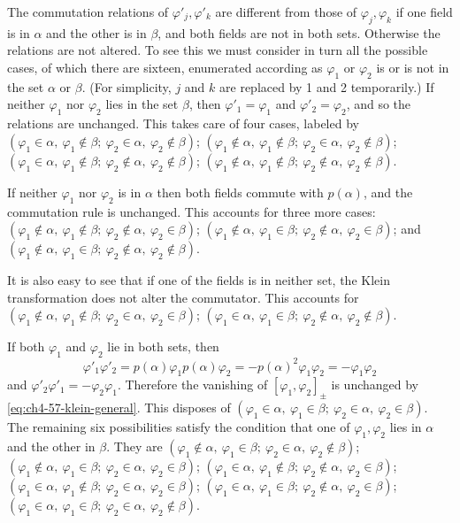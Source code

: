 The commutation relations of $\varphi'_j,\varphi'_k$ are different from those
of $\varphi_j,\varphi_k$ if one field is in $\alpha$ and the other is in
$\beta$, and both fields are not in both sets.  Otherwise the relations are
not altered.  To see this we must consider in turn all the possible cases, of
which there are sixteen, enumerated according as $\varphi_1$ or $\varphi_2$
is or is not in the set $\alpha$ or $\beta$.  (For simplicity, $j$ and $k$
are replaced by 1 and 2 temporarily.)  If neither $\varphi_1$ nor
$\varphi_2$ lies in the set $\beta$, then $\varphi'_1=\varphi_1$ and
$\varphi'_2=\varphi_2$, and so the relations are unchanged.  This takes care
of four cases, labeled by
$(\varphi_1\in\alpha,\ \varphi_1\notin\beta;\ \varphi_2\in\alpha,\ \varphi_2\notin\beta)$;
$(\varphi_1\notin\alpha,\ \varphi_1\notin\beta;\ \varphi_2\in\alpha,\ \varphi_2\notin\beta)$;
$(\varphi_1\in\alpha,\ \varphi_1\notin\beta;\ \varphi_2\notin\alpha,\ \varphi_2\notin\beta)$;
$(\varphi_1\notin\alpha,\ \varphi_1\notin\beta;\ \varphi_2\notin\alpha,\ \varphi_2\notin\beta)$.

If neither $\varphi_1$ nor $\varphi_2$ is in $\alpha$ then both fields commute
with $p(\alpha)$, and the commutation rule is unchanged.  This accounts for
three more cases:
$(\varphi_1\notin\alpha,\ \varphi_1\notin\beta;\ \varphi_2\notin\alpha,\ \varphi_2\in\beta)$;
$(\varphi_1\notin\alpha,\ \varphi_1\in\beta;\ \varphi_2\notin\alpha,\ \varphi_2\in\beta)$;
and $(\varphi_1\notin\alpha,\ \varphi_1\in\beta;\ \varphi_2\notin\alpha,\ \varphi_2\notin\beta)$.

It is also easy to see that if one of the fields is in neither set, the Klein
transformation does not alter the commutator.  This accounts for
$(\varphi_1\notin\alpha,\ \varphi_1\notin\beta;\ \varphi_2\in\alpha,\ \varphi_2\in\beta)$;
$(\varphi_1\in\alpha,\ \varphi_1\in\beta;\ \varphi_2\notin\alpha,\ \varphi_2\notin\beta)$.

If both $\varphi_1$ and $\varphi_2$ lie in both sets, then
\[
  \varphi'_1\varphi'_2=p(\alpha)\varphi_1p(\alpha)\varphi_2
  =-p(\alpha)^2\varphi_1\varphi_2=-\varphi_1\varphi_2
\]
and $\varphi'_2\varphi'_1=-\varphi_2\varphi_1$.  Therefore the vanishing of
$[\varphi_1,\varphi_2]_\pm$ is unchanged by \eqref{eq:ch4-57-klein-general}.  This disposes of
$(\varphi_1\in\alpha,\ \varphi_1\in\beta;\ \varphi_2\in\alpha,\ \varphi_2\in\beta)$.
The remaining six possibilities satisfy the condition that one of
$\varphi_1,\varphi_2$ lies in $\alpha$ and the other in $\beta$.  They are
$(\varphi_1\notin\alpha,\ \varphi_1\in\beta;\ \varphi_2\in\alpha,\ \varphi_2\notin\beta)$;
$(\varphi_1\notin\alpha,\ \varphi_1\in\beta;\ \varphi_2\in\alpha,\ \varphi_2\in\beta)$;
$(\varphi_1\in\alpha,\ \varphi_1\notin\beta;\ \varphi_2\notin\alpha,\ \varphi_2\in\beta)$;
$(\varphi_1\in\alpha,\ \varphi_1\notin\beta;\ \varphi_2\in\alpha,\ \varphi_2\in\beta)$;
$(\varphi_1\in\alpha,\ \varphi_1\in\beta;\ \varphi_2\notin\alpha,\ \varphi_2\in\beta)$;
$(\varphi_1\in\alpha,\ \varphi_1\in\beta;\ \varphi_2\in\alpha,\ \varphi_2\notin\beta)$.

